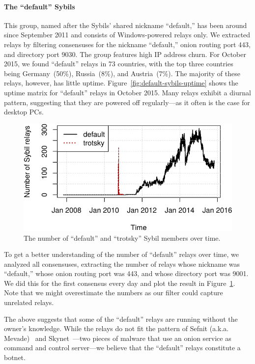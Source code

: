 \paragraph{The ``default'' Sybils}
This group, named after the Sybils' shared nickname ``default,'' has been around
since September 2011 and consists of Windows-powered relays only.  We extracted
relays by filtering consensuses for the nickname ``default,'' onion routing port
443, and directory port 9030.  The group features high IP address churn.  For
October 2015, we found ``default'' relays in 73 countries, with the top three
countries being Germany~(50\%), Russia~(8\%), and Austria~(7\%).  The majority
of these relays, however, has little uptime.
Figure~\ref{fig:default-sybils-uptime} shows the uptime matrix for ``default''
relays in October 2015.  Many relays exhibit a diurnal pattern, suggesting that
they are powered off regularly---as it often is the case for desktop PCs.

\begin{figure}[t]
	\centering
	\includegraphics[width=\linewidth]{diagrams/default-over-time}
	\caption{The number of ``default'' and ``trotsky'' Sybil members over time.}
	\label{fig:default-over-time}
\end{figure}

To get a better understanding of the number of ``default'' relays over time, we
analyzed all consensuses, extracting the number of relays whose nickname was
``default,'' whose onion routing port was 443, and whose directory port was
9001.  We did this for the first consensus every day and plot the result in
Figure~\ref{fig:default-over-time}.  Note that we might overestimate the numbers
as our filter could capture unrelated relays.

The above suggests that some of the ``default'' relays are running without the
owner's knowledge.  While the relays do not fit the pattern of Sefnit (a.k.a.
Mevade)~\cite{sefnit} and Skynet~\cite{skynet}---two pieces of malware that use
an onion service as command and control server---we believe that the ``default''
relays constitute a botnet.

